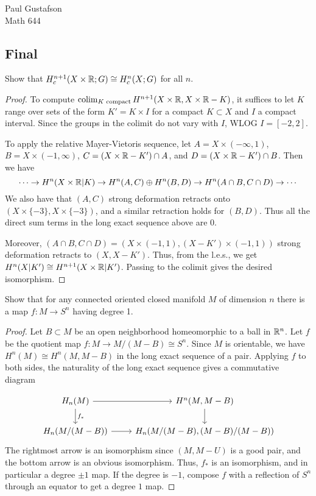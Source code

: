 \documentclass{article}
\begin{document}
\noindent Paul Gustafson\\
\noindent Math 644

\subsection*{Final}
 Show that $H_c^{n+1}(X \times \mathbb{R}; G) \cong H_c^n(X; G)$ for all $n$.
\begin{proof}
To compute $\operatorname{colim}_{K \text{ compact}} H^{n+1}(X \times \mathbb{R}, X \times \mathbb{R} - K)$, it suffices to let $K$ range over sets of the form $K' = K \times I$ for a compact $K \subset X$ and $I$ a compact interval.  Since the groups in the colimit do not vary with $I$, WLOG $I = [-2,2]$.

To apply the relative Mayer-Vietoris sequence, let $A = X \times (-\infty, 1)$,
$B = X \times (-1, \infty)$, $C = (X \times \mathbb{R} - K') \cap A$, and $D = (X \times \mathbb{R} - K') \cap B$. Then we have
$$
\cdots \to H^n(X \times \mathbb{R} | K) \to H^n(A, C) \oplus H^n(B,D) \to H^n(A \cap B,
C \cap D) \to  \cdots
$$
We also have that $(A, C)$ strong deformation retracts onto $(X \times \{-3\} , X \times \{-3\})$, and a similar retraction holds for $(B, D)$. Thus all the direct sum terms in the long exact sequence above are 0.

 Moreover, $(A \cap B, C \cap D) = (X \times (-1,1), (X - K') \times (-1,1))$ strong deformation retracts to $(X, X - K')$.  Thus, from the l.e.s., we get
$H^n(X | K') \cong H^{n+1}(X \times \mathbb{R} | K')$.  Passing to the colimit gives the desired isomorphism.
\end{proof}

 Show that for any connected oriented closed manifold $M$ of dimension $n$ there is a map $f : M \to S^n$ having degree 1.
\begin{proof}
Let $B \subset M$ be an open neighborhood homeomorphic to a ball in $\mathbb{R}^n$.  Let $f$ be the quotient map $f: M \to M/(M-B) \cong S^n$.
Since $M$ is orientable, we have $H^n(M) \cong H^n(M, M - B)$ in the long exact sequence of a pair. Applying $f$ to both sides, the 
naturality of the long exact sequence gives a commutative diagram

\[
\begin{tikzcd}
H_n(M) \arrow{r} \arrow{d}{f_*} &  H^n(M, M - B) \arrow{d} \\
H_n(M/(M - B)) \arrow{r} & H_n(M/(M - B), (M - B)/(M - B))
\end{tikzcd}
\]
The rightmost arrow is an isomorphism since $(M, M-U)$ is a good pair, and the bottom arrow is an obvious isomorphism.  Thus, $f_*$ is an isomorphism, and in particular a degree $\pm 1$ map. If the degree is $-1$, compose $f$ with a reflection of $S^n$ through an equator to get a degree $1$ map.
\end{proof}
\end{document}
